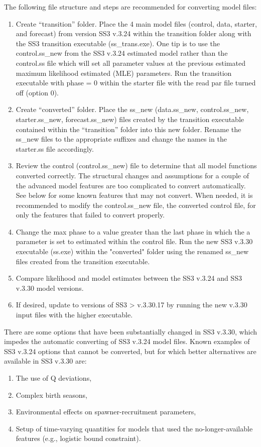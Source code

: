 The following file structure and steps are recommended for converting model files:
\begin{enumerate}
	\item Create ``transition'' folder.  Place the 4 main model files (control, data, starter, and forecast) from version SS3 v.3.24 within the transition folder along with the SS3 transition executable (ss\_trans.exe).  One tip is to use the control.ss\_new from the SS3 v.3.24 estimated model rather than the control.ss file which will set all parameter values at the previous estimated maximum likelihood estimated (MLE) parameters.  Run the transition executable with phase = 0 within the starter file with the read par file turned off (option 0).
	
	\item Create ``converted'' folder.  Place the ss\_new (data.ss\_new, control.ss\_new, starter.ss\_new, forecast.ss\_new) files created by the transition executable contained within the ``transition'' folder into this new folder.  Rename the ss\_new files to the appropriate suffixes and change the names in the starter.ss file accordingly.
	
	\item Review the control (control.ss\_new) file to determine that all model functions converted correctly.  The structural changes and assumptions for a couple of the advanced model features are too complicated to convert automatically.  See below for some known features that may not convert. When needed, it is recommended to modify the control.ss\_new file, the converted control file, for only the features that failed to convert properly.
	
	\item Change the max phase to a value greater than the last phase in which the a parameter is set to estimated within the control file.  Run the new SS3 v.3.30 executable (ss.exe) within the "converted" folder using the renamed ss\_new files created from the transition executable.
	
	\item Compare likelihood and model estimates between the SS3 v.3.24 and SS3 v.3.30 model versions.
	
	\item If desired, update to versions of SS3 > v.3.30.17 by running the new v.3.30 input files with the higher executable.
\end{enumerate}

\noindent There are some options that have been substantially changed in SS3 v.3.30, which impedes the automatic converting of SS3 v.3.24 model files. Known examples of SS3 v.3.24 options that cannot be converted, but for which better alternatives are available in SS3 v.3.30 are:
\begin{enumerate}
	\item The use of Q deviations,
	\item Complex birth seasons,
	\item Environmental effects on spawner-recruitment parameters,
	\item Setup of time-varying quantities for models that used the no-longer-available features (e.g., logistic bound constraint).\end{enumerate}

\pagebreak
